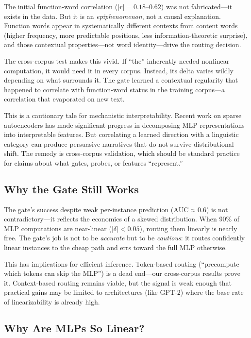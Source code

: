 \documentclass[11pt]{article}
\begin{document}
The initial function-word correlation ($|r| = 0.18$--$0.62$) was not fabricated---it exists in the data. But it is an \textit{epiphenomenon}, not a causal explanation. Function words appear in systematically different contexts from content words (higher frequency, more predictable positions, less information-theoretic surprise), and those contextual properties---not word identity---drive the routing decision.

The cross-corpus test makes this vivid. If ``the'' inherently needed nonlinear computation, it would need it in every corpus. Instead, its delta varies wildly depending on what surrounds it. The gate learned a contextual regularity that happened to correlate with function-word status in the training corpus---a correlation that evaporated on new text.

This is a cautionary tale for mechanistic interpretability. Recent work on sparse autoencoders \citep{bricken2023, cunningham2023} has made significant progress in decomposing MLP representations into interpretable features. But correlating a learned direction with a linguistic category can produce persuasive narratives that do not survive distributional shift. The remedy is cross-corpus validation, which should be standard practice for claims about what gates, probes, or features ``represent.''

\subsection{Why the Gate Still Works}

The gate's success despite weak per-instance prediction ($\text{AUC} \approx 0.6$) is not contradictory---it reflects the economics of a skewed distribution. When 90\% of MLP computations are near-linear ($|\delta| < 0.05$), routing them linearly is nearly free. The gate's job is not to be \textit{accurate} but to be \textit{cautious}: it routes confidently linear instances to the cheap path and errs toward the full MLP otherwise.

This has implications for efficient inference. Token-based routing (``precompute which tokens can skip the MLP'') is a dead end---our cross-corpus results prove it. Context-based routing remains viable, but the signal is weak enough that practical gains may be limited to architectures (like GPT-2) where the base rate of linearizability is already high.

\subsection{Why Are MLPs So Linear?}
\end{document}
